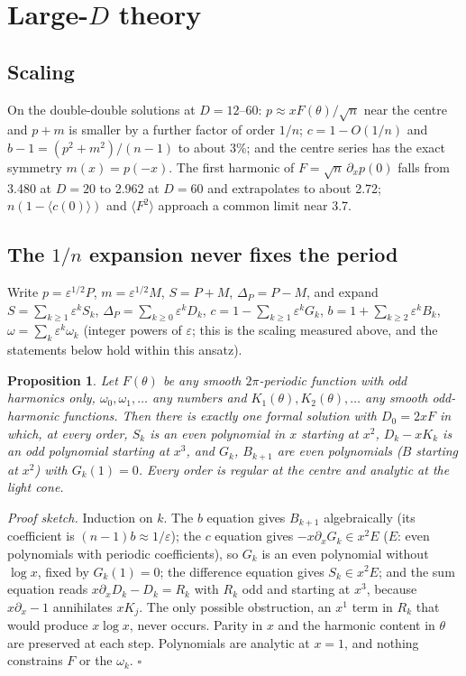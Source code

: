 \documentclass[aps,prd,onecolumn,superscriptaddress,nofootinbib,10pt]{revtex4-2}
\newcommand{\eps}{\varepsilon}
\newtheorem{proposition}{Proposition}
\begin{document}
\section{Large-$D$ theory}
\label{sec:theory}

\subsection{Scaling}

On the double-double solutions at $D = 12$--$60$: $p \approx x F(\theta)/\sqrt n$ near the centre and $p + m$ is
smaller by a further factor of order $1/n$; $c = 1 - O(1/n)$ and $b - 1 = (p^2+m^2)/(n-1)$ to about 3\%; and the
centre series has the exact symmetry $m(x) = p(-x)$. The first harmonic of $F = \sqrt n\,\partial_x p(0)$ falls from
3.480 at $D = 20$ to 2.962 at $D = 60$ and extrapolates to about 2.72; $n(1 - \langle c(0)\rangle)$ and $\langle F^2\rangle$
approach a common limit near 3.7.

\subsection{The $1/n$ expansion never fixes the period}

Write $p = \eps^{1/2}P$, $m = \eps^{1/2}M$, $S = P + M$, $\Delta_P = P - M$, and expand $S = \sum_{k\ge1}\eps^kS_k$,
$\Delta_P = \sum_{k\ge0}\eps^kD_k$, $c = 1 - \sum_{k\ge1}\eps^kG_k$, $b = 1 + \sum_{k\ge2}\eps^kB_k$,
$\omega = \sum_k\eps^k\omega_k$ (integer powers of $\eps$; this is the scaling measured above, and the statements below
hold within this ansatz).

\begin{proposition}\label{prop:1}
Let $F(\theta)$ be any smooth $2\pi$-periodic function with odd harmonics only, $\omega_0, \omega_1, \dots$ any numbers
and $K_1(\theta), K_2(\theta), \dots$ any smooth odd-harmonic functions. Then there is exactly one formal solution with
$D_0 = 2xF$ in which, at every order, $S_k$ is an even polynomial in $x$ starting at $x^2$, $D_k - xK_k$ is an odd
polynomial starting at $x^3$, and $G_k$, $B_{k+1}$ are even polynomials ($B$ starting at $x^2$) with $G_k(1) = 0$. Every
order is regular at the centre and analytic at the light cone.
\end{proposition}

\emph{Proof sketch.} Induction on $k$. The $b$ equation gives $B_{k+1}$ algebraically (its coefficient is
$(n-1)b \approx 1/\eps$); the $c$ equation gives $-x\partial_xG_k \in x^2E$ ($E$: even polynomials with periodic
coefficients), so $G_k$ is an even polynomial without $\log x$, fixed by $G_k(1) = 0$; the difference equation gives
$S_k \in x^2E$; and the sum equation reads $x\partial_xD_k - D_k = R_k$ with $R_k$ odd and starting at $x^3$, because
$x\partial_x - 1$ annihilates $xK_j$. The only possible obstruction, an $x^1$ term in $R_k$ that would produce $x\log x$,
never occurs. Parity in $x$ and the harmonic content in $\theta$ are preserved at each step. Polynomials are analytic
at $x = 1$, and nothing constrains $F$ or the $\omega_k$. $\square$
\end{document}
